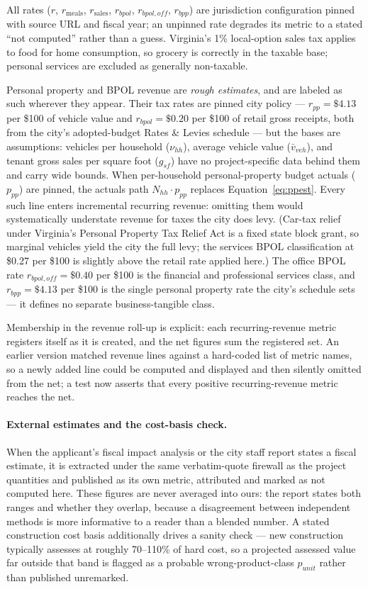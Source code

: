 \documentclass[11pt]{article}
\begin{document}
All rates ($r$, $r_{\mathrm{meals}}$, $r_{\mathrm{sales}}$, $r_{bpol}$,
$r_{bpol,off}$, $r_{bpp}$) are jurisdiction configuration pinned with source URL
and fiscal year; an unpinned rate degrades its metric to a stated ``not
computed'' rather than a guess. Virginia's 1\% local-option sales tax applies to
food for home consumption, so grocery is correctly in the taxable base;
personal services are excluded as generally non-taxable.

Personal property and BPOL revenue are \emph{rough estimates}, and are labeled
as such wherever they appear. Their tax rates are pinned city policy ---
$r_{pp} = \$4.13$ per \$100 of vehicle value and $r_{bpol} = \$0.20$ per \$100
of retail gross receipts, both from the city's adopted-budget Rates \& Levies
schedule --- but the bases are assumptions: vehicles per household
($\nu_{hh}$), average vehicle value ($\bar{v}_{veh}$), and tenant gross sales
per square foot ($g_{sf}$) have no project-specific data behind them and carry
wide bounds. When per-household personal-property budget actuals ($p_{pp}$)
are pinned, the actuals path $N_{hh} \cdot p_{pp}$ replaces
Equation~\eqref{eq:ppest}. Every such line enters incremental recurring
revenue: omitting them would systematically understate revenue for taxes the
city does levy. (Car-tax relief under Virginia's Personal Property Tax Relief
Act is a fixed state block grant, so
marginal vehicles yield the city the full levy; the services BPOL
classification at \$0.27 per \$100 is slightly above the retail rate applied
here.) The office BPOL rate $r_{bpol,off} = \$0.40$ per \$100 is the financial
and professional services class, and $r_{bpp} = \$4.13$ per \$100 is the single
personal property rate the city's schedule sets --- it defines no separate
business-tangible class.

Membership in the revenue roll-up is explicit: each recurring-revenue metric
registers itself as it is created, and the net figures sum the registered set.
An earlier version matched revenue lines against a hard-coded list of metric
names, so a newly added line could be computed and displayed and then silently
omitted from the net; a test now asserts that every positive recurring-revenue
metric reaches the net.

\paragraph{External estimates and the cost-basis check.}
When the applicant's fiscal impact analysis or the city staff report states a
fiscal estimate, it is extracted under the same verbatim-quote firewall as the
project quantities and published as its own metric, attributed and marked as
not computed here. These figures are never averaged into ours: the report
states both ranges and whether they overlap, because a disagreement between
independent methods is more informative to a reader than a blended number.
A stated construction cost basis additionally drives a sanity check --- new
construction typically assesses at roughly 70--110\% of hard cost, so a
projected assessed value far outside that band is flagged as a probable
wrong-product-class $p_{unit}$ rather than published unremarked.
\end{document}
